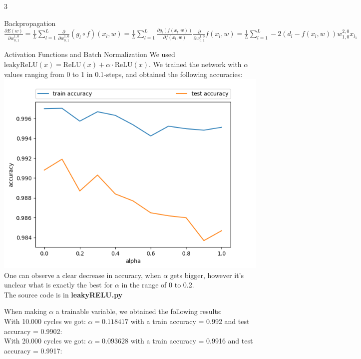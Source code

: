 \documentclass{article}
\begin{document}
\begin{ukon-infie}[24.12.17]{3}
\begin{exercise}[p=25]{Backpropagation}
{		$\frac{\partial E(w)}{\partial w_{0,1}^{1,0}} = \frac{1}{L} \sum_{l=1}^L \frac{\partial}{\partial w_{0,1}^{1,0}}(g_l \circ f) (x_l, w) = \frac{1}{L} \sum_{l=1}^L \frac{\partial g_l(f(x_l,w))}{\partial f(x_l,w)} \frac{\partial}{\partial w_{0,1}^{1,0}}f(x_l, w)  = \frac{1}{L} \sum_{l=1}^L -2(d_l - f(x_l, w))w_{1,0}^{2,0}x_{l_1}$
		}
		\end{exercise}
		
		\begin{exercise}[p=40+20]{Activation Functions and Batch Normalization}
		\question{}
		{
			We used $\text{leakyReLU}(x) = \text{ReLU}(x) + \alpha \cdot \text{ReLU}(x)$.
		}
		\question{}
		{
			We trained the network with $\alpha$ values ranging from 0 to 1 in 0.1-steps, and obtained the following accuracies:\\
			\includegraphics[scale=0.6]{leaky_ReLU_different_alphas.png}\\
			
			One can observe a clear decrease in accuracy, when $\alpha$ gets bigger, however it's unclear what is exactly the best for $\alpha$ in the range of 0 to 0.2.\\
			The source code is in \textbf{leakyRELU.py}
		}
		
		\question{}
		{
			When making $\alpha$ a trainable variable, we obtained the following results:\\
			With 10.000 cycles we got: $\alpha = 0.118417$ with a train accuracy = 0.992 and test accuracy = 0.9902:\\
			With 20.000 cycles we got: $\alpha = 0.093628$ with a train accuracy =  0.9916 and test accuracy =  0.9917:\\
			
}
\end{exercise}
\end{ukon-infie}
\end{document}
